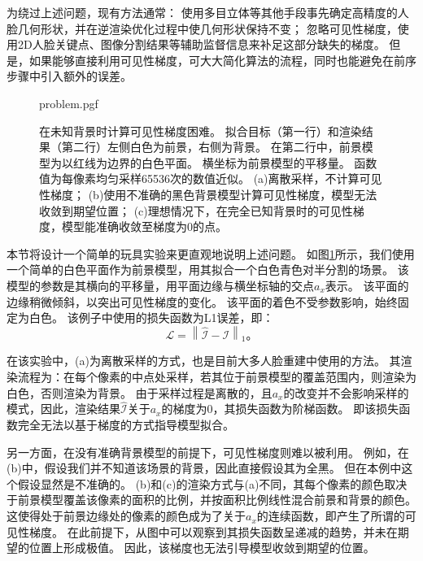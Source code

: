 为绕过上述问题，现有方法通常：
使用多目立体等其他手段事先确定高精度的人脸几何形状，并在逆渲染优化过程中使几何形状保持不变\citep{RiviereGBGB20}；
忽略可见性梯度，使用2D人脸关键点\citep{deep3d}、图像分割\citep{nvdiffrec}结果等辅助监督信息来补足这部分缺失的梯度。
但是，如果能够直接利用可见性梯度，可大大简化算法的流程，同时也能避免在前序步骤中引入额外的误差。

\begin{figure}
    \centering
    {problem.pgf}
    \caption[在未知背景时计算可见性梯度困难]{
        在未知背景时计算可见性梯度困难。
        拟合目标（第一行）和渲染结果（第二行）左侧白色为前景，右侧为背景。
        在第二行中，前景模型为以红线为边界的白色平面。
        横坐标为前景模型的平移量。
        函数值为每像素均匀采样65536次的数值近似。
        (a)离散采样，不计算可见性梯度；
        (b)使用不准确的黑色背景模型计算可见性梯度，模型无法收敛到期望位置；
        (c)理想情况下，在完全已知背景时的可见性梯度，模型能准确收敛至梯度为0的点。
    }
    \label{fig:problem}
\end{figure}
本节将设计一个简单的玩具实验来更直观地说明上述问题。
如图\ref{fig:problem}所示，我们使用一个简单的白色平面作为前景模型，用其拟合一个白色青色对半分割的场景。
该模型的参数是其横向的平移量，用平面边缘与横坐标轴的交点$a_x$表示。
该平面的边缘稍微倾斜，以突出可见性梯度的变化。
该平面的着色不受参数影响，始终固定为白色。
该例子中使用的损失函数为L1误差，即：
\begin{equation}
\mathcal{L} = \left\| \hat{\mathcal{I}} - \mathcal{I} \right\|_1
\text{。}
\label{eq:loss_l1}
\end{equation}

在该实验中，(a)为离散采样的方式，也是目前大多人脸重建中使用的方法。
其渲染流程为：在每个像素的中点处采样，若其位于前景模型的覆盖范围内，则渲染为白色，否则渲染为背景。
由于采样过程是离散的，且$a_x$的改变并不会影响采样的模式，因此，渲染结果$\hat{\mathcal{I}}$关于$a_x$的梯度为0，其损失函数为阶梯函数。
即该损失函数完全无法以基于梯度的方式指导模型拟合。

另一方面，在没有准确背景模型的前提下，可见性梯度则难以被利用。
例如，在(b)中，假设我们并不知道该场景的背景，因此直接假设其为全黑。
但在本例中这个假设显然是不准确的。
(b)和(c)的渲染方式与(a)不同，其每个像素的颜色取决于前景模型覆盖该像素的面积的比例，并按面积比例线性混合前景和背景的颜色。
这使得处于前景边缘处的像素的颜色成为了关于$a_x$的连续函数，即产生了所谓的可见性梯度。
在此前提下，从图中可以观察到其损失函数呈递减的趋势，并未在期望的位置上形成极值。
因此，该梯度也无法引导模型收敛到期望的位置。

